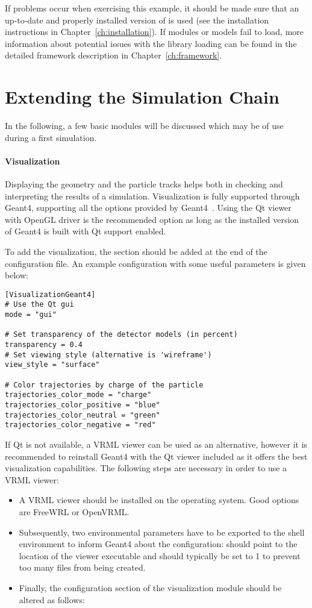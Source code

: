 \begin{itemize}
If problems occur when exercising this example, it should be made sure that an up-to-date and properly installed version of \apsq is used (see the installation instructions in Chapter~\ref{ch:installation}).
If modules or models fail to load, more information about potential issues with the library loading can be found in the detailed framework description in Chapter~\ref{ch:framework}.

\section{Extending the Simulation Chain}
In the following, a few basic modules will be discussed which may be of use during a first simulation.

\paragraph{Visualization}
Displaying the geometry and the particle tracks helps both in checking and interpreting the results of a simulation.
Visualization is fully supported through Geant4, supporting all the options provided by Geant4~\cite{geant4vis}.
Using the Qt viewer with OpenGL driver is the recommended option as long as the installed version of Geant4 is built with Qt support enabled.

To add the visualization, the  section should be added at the end of the configuration file.
An example configuration with some useful parameters is given below:
\begin{verbatim}
[VisualizationGeant4]
# Use the Qt gui
mode = "gui"

# Set transparency of the detector models (in percent)
transparency = 0.4
# Set viewing style (alternative is 'wireframe')
view_style = "surface"

# Color trajectories by charge of the particle
trajectories_color_mode = "charge"
trajectories_color_positive = "blue"
trajectories_color_neutral = "green"
trajectories_color_negative = "red"
\end{verbatim}
If Qt is not available, a VRML viewer can be used as an alternative, however it is recommended to reinstall Geant4 with the Qt viewer included as it offers the best visualization capabilities.
The following steps are necessary in order to use a VRML viewer:
\begin{itemize}
\item A VRML viewer should be installed on the operating system.
Good options are FreeWRL or OpenVRML.
\item Subsequently, two environmental parameters have to be exported to the shell environment to inform Geant4 about the configuration:
 should point to the location of the viewer executable and  should typically be set to 1 to prevent too many files from being created.
\item Finally, the configuration section of the visualization module should be altered as follows:
\end{itemize}


\end{itemize}
